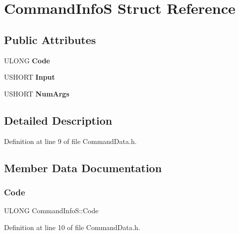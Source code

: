 \hypertarget{struct_command_info_s}{}\section{Command\+InfoS Struct Reference}
\label{struct_command_info_s}
\subsection*{Public Attributes}
\begin{DoxyCompactItemize}
\item 
\mbox{\label{struct_command_info_s_aafb2f1e06117d55f5fca8e92b55889b8}} 
U\+L\+O\+NG {\bfseries Code}
\item 
\mbox{\label{struct_command_info_s_a9c07e855e5e5ed3a3614fc747e812962}} 
U\+S\+H\+O\+RT {\bfseries Input}
\item 
\mbox{\label{struct_command_info_s_a4a20f7982a7609ee531c5cbbdd85dc70}} 
U\+S\+H\+O\+RT {\bfseries Num\+Args}
\end{DoxyCompactItemize}


\subsection{Detailed Description}


Definition at line 9 of file Command\+Data.\+h.



\subsection{Member Data Documentation}
\mbox{\label{struct_command_info_s_aafb2f1e06117d55f5fca8e92b55889b8}} 
\subsubsection{\texorpdfstring{Code}{Code}}
{\footnotesize\ttfamily U\+L\+O\+NG Command\+Info\+S\+::\+Code}



Definition at line 10 of file Command\+Data.\+h.

\mbox{\label{struct_command_info_s_a9c07e855e5e5ed3a3614fc747e812962}} 

